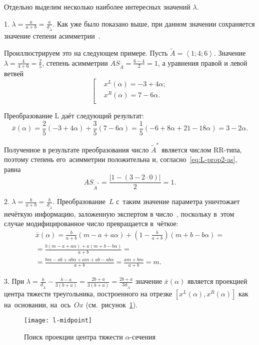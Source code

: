 Отдельно выделим несколько наиболее интересных значений $\lambda$.

1. $\displaystyle \lambda =\frac{a}{a+b}=\frac{a}{d_{\tilde A}}$. Как уже было показано выше, при данном значении сохраняется значение степени асимметрии~\cite{VSU-1}.

Проиллюстрируем это на следующем примере. Пусть $\tilde{A}=\left\langle 1;4;6 \right\rangle $. Значение $\displaystyle \lambda =\frac{4}{4+6}=\frac{2}{5}$, степень асимметрии $\displaystyle AS_{\tilde A}=\frac{6-4}{2}=1$, а уравнения правой и левой ветвей
\begin{equation*}
  \left[ \begin{aligned}
    & {{x}^{L}}\left( \alpha  \right)=-3+4\alpha; \\ 
    & {{x}^{R}}\left( \alpha  \right)=7-6\alpha. \\ 
  \end{aligned} \right.
\end{equation*}

Преобразование L даёт следующий результат:
\begin{equation*}
  \bar{x}\left( \alpha  \right)=\frac{2}{5}\left( -3+4\alpha  \right)+\frac{3}{5}\left( 7-6\alpha  \right)=\frac{1}{5}\left( -6+8\alpha +21-18\alpha  \right)=3-2\alpha.
\end{equation*}

Полученное в результате преобразования число $\tilde A^{*}$ является числом RR-типа, поэтому степень его~асимметрии положительна и, согласно~\eqref{eq:L-prop2-as}, равна
\begin{equation*}
  AS_{\tilde A^{*}}=\frac{\left| 1-\left( 3-2\cdot 0 \right) \right|}{2}=1.
\end{equation*}

2. $\displaystyle \lambda =\frac{b}{a+b}=\frac{b}{d_{\tilde A}}$. Преобразование~$L$ с~таким значение параметра уничтожает нечёткую информацию, заложенную экспертом в число~\cite{Vorontsov_PI}, поскольку в~этом случае модифицированное число превращается в~чёткое:
\begin{gather*}
  \bar{x}\left( \alpha  \right)=\frac{b}{a+b}\left( m-a+a\alpha \right)+\left( 1-\frac{b}{a+b} \right)\left( m+b-b\alpha \right)={}\\
  {}=\frac{b\left( m-a+a\alpha  \right)+a\left( m+b-b\alpha \right)}{a+b}={} \\ 
  {}=\frac{bm-ab+ab\alpha +am+ab-ab\alpha }{a+b}=\frac{am+bm}{a+b}=m. 
\end{gather*}

3. При $\displaystyle \lambda =\frac{b}{d_{\tilde A}}-\frac{b-a}{3\left( b+a \right)}=\frac{2b+a}{3\left( b+a \right)}=\frac{2b+a}{3d_{\tilde A}}$ значение $\bar{x}(\alpha )$ является проекцией центра тяжести треугольника, построенного на отрезке $\left[ {{x}^{L}}(\alpha ), x^R\left(\alpha \right) \right]$ как на~основании, на~ось~$Ox$ (см.~рисунок~\ref{fig:l-midpoint}).
\begin{figure}[h!]
  \centering
  {
    \texttt{[image: l-midpoint]}
    \caption{Поиск проекции центра тяжести $\alpha$-сечения}
    \label{fig:l-midpoint}
  }
\end{figure}

